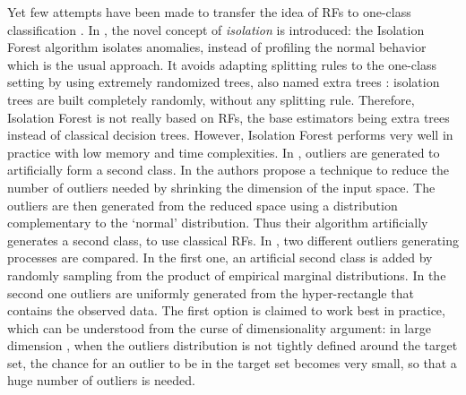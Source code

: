 Yet few attempts have been made to transfer the idea of RFs to one-class
classification \citep{Desir12, Liu2008, Shi2012}.
%
In \cite{Liu2008}, the novel concept of \emph{isolation} is introduced: the Isolation Forest algorithm isolates anomalies, instead of profiling the normal behavior which is the usual approach. It avoids adapting splitting rules to the one-class setting by using extremely randomized trees, also named extra trees \citep{Geurts2006}: isolation trees are built completely randomly, without any splitting rule. %
Therefore, Isolation Forest is not really based on RFs, the base estimators being extra trees instead of classical decision trees. However, Isolation Forest performs very well in practice with low memory and time complexities.
In \cite{Desir12, Shi2012}, outliers are generated to artificially form a second
class.
%
In \cite{Desir12} the authors propose a technique to reduce the number of
outliers needed by shrinking the dimension of the input space. The outliers
are then generated from the reduced space using a distribution complementary to the `normal'
distribution. Thus their algorithm artificially generates a second class, to
use classical RFs.
%
In \cite{Shi2012}, two different outliers generating processes are compared.
In the first one, an artificial second class is added by randomly sampling
from the product of empirical marginal distributions. In the second one
outliers are uniformly generated from the hyper-rectangle that contains the
observed data. The first option is claimed to work best in practice, which can
be understood from the curse of dimensionality argument:
%
in large dimension \citep{Tax2002}, when the outliers distribution is not tightly defined around the target set,
the chance for an outlier to be in the target set becomes very small, so that a huge number of outliers is needed.
%

